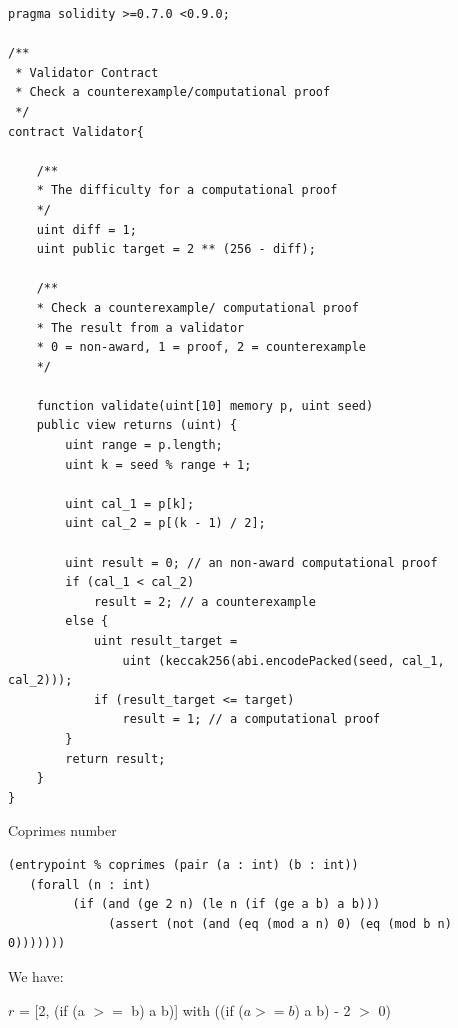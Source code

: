 \documentclass[runningheads]{llncs}
\begin{document}
\begin{lstlisting}[numbers=none]
pragma solidity >=0.7.0 <0.9.0;

/**
 * Validator Contract
 * Check a counterexample/computational proof
 */
contract Validator{

    /**
    * The difficulty for a computational proof
    */
    uint diff = 1;
    uint public target = 2 ** (256 - diff); 

    /**
    * Check a counterexample/ computational proof
    * The result from a validator
    * 0 = non-award, 1 = proof, 2 = counterexample
    */

    function validate(uint[10] memory p, uint seed) 
    public view returns (uint) {
        uint range = p.length; 
        uint k = seed % range + 1;

        uint cal_1 = p[k];
        uint cal_2 = p[(k - 1) / 2];

        uint result = 0; // an non-award computational proof 
        if (cal_1 < cal_2)  
            result = 2; // a counterexample
        else {
            uint result_target = 
                uint (keccak256(abi.encodePacked(seed, cal_1, cal_2)));
            if (result_target <= target) 
                result = 1; // a computational proof      
        }              
        return result;           
    }
}

\end{lstlisting}

Coprimes number

\begin{lstlisting}[numbers=none]
(entrypoint % coprimes (pair (a : int) (b : int))
   (forall (n : int)
         (if (and (ge 2 n) (le n (if (ge a b) a b)))
              (assert (not (and (eq (mod a n) 0) (eq (mod b n) 0)))))))
\end{lstlisting}


\noindent We have:

$r$ = [2, (if (a $>=$ b) a b)] with ((if ($a >= b$) a b) - 2 $>$ 0)
\end{document}
